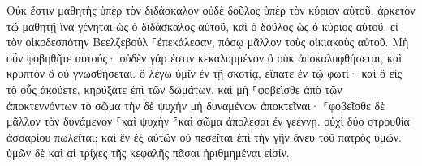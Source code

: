 \documentclass{openreader}
\begin{document}
Οὐκ ἔστιν μαθητὴς ὑπὲρ τὸν διδάσκαλον οὐδὲ δοῦλος ὑπὲρ τὸν κύριον αὐτοῦ. 
ἀρκετὸν τῷ μαθητῇ ἵνα γένηται ὡς ὁ διδάσκαλος αὐτοῦ, καὶ ὁ δοῦλος ὡς ὁ κύριος αὐτοῦ. εἰ τὸν οἰκοδεσπότην Βεελζεβοὺλ ⸀ἐπεκάλεσαν, πόσῳ μᾶλλον τοὺς οἰκιακοὺς αὐτοῦ. 
Μὴ οὖν φοβηθῆτε αὐτούς· οὐδὲν γάρ ἐστιν κεκαλυμμένον ὃ οὐκ ἀποκαλυφθήσεται, καὶ κρυπτὸν ὃ οὐ γνωσθήσεται. 
ὃ λέγω ὑμῖν ἐν τῇ σκοτίᾳ, εἴπατε ἐν τῷ φωτί· καὶ ὃ εἰς τὸ οὖς ἀκούετε, κηρύξατε ἐπὶ τῶν δωμάτων. 
καὶ μὴ ⸀φοβεῖσθε ἀπὸ τῶν ἀποκτεννόντων τὸ σῶμα τὴν δὲ ψυχὴν μὴ δυναμένων ἀποκτεῖναι· ⸁φοβεῖσθε δὲ μᾶλλον τὸν δυνάμενον ⸀καὶ ψυχὴν ⸁καὶ σῶμα ἀπολέσαι ἐν γεέννῃ. 
οὐχὶ δύο στρουθία ἀσσαρίου πωλεῖται; καὶ ἓν ἐξ αὐτῶν οὐ πεσεῖται ἐπὶ τὴν γῆν ἄνευ τοῦ πατρὸς ὑμῶν. 
ὑμῶν δὲ καὶ αἱ τρίχες τῆς κεφαλῆς πᾶσαι ἠριθμημέναι εἰσίν. 
\end{document}
